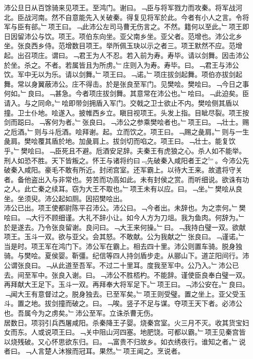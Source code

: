 \documentclass{zhvt-classic}
\begin{document}
\hspace*{2em}沛公旦日从百馀骑来见项王。至鸿门。谢曰。﹁臣与将军戮力而攻秦。将军战河北。臣战河南。然不自意能先入关破秦。得复见将军於此。今者有小人之言。令将军与臣有郤。﹂项王曰。﹁此沛公左司马曹无伤言之。不然。籍何以至此。﹂项王即日因留沛公与饮。项王。项伯东向坐。亚父南乡坐。亚父者。范增也。沛公北乡坐。张良西乡侍。范增数目项王。举所佩玉玦以示之者三。项王默然不应。范增起。出召项庄。谓曰。﹁君王为人不忍。若入前为寿。寿毕。请以剑舞。因击沛公於坐。杀之。不者。若属皆且为所虏。﹂庄则入为寿。寿毕。曰。﹁君王与沛公饮。军中无以为乐。请以剑舞。﹂项王曰。﹁诺。﹂项庄拔剑起舞。项伯亦拔剑起舞。常以身翼蔽沛公。庄不得击。於是张良至军门。见樊哙。樊哙曰。﹁今日之事何如。﹂良曰。﹁甚急。今者项庄拔剑舞。其意常在沛公也。﹂哙曰。﹁此迫矣。臣请入。与之同命。﹂哙即带剑拥盾入军门。交戟之卫士欲止不内。樊哙侧其盾以撞。卫士仆地。哙遂入。披帷西乡立。瞋目视项王。头发上指。目眦尽裂。项王按剑而跽曰。﹁客何为者。﹂张良曰。﹁沛公之参乘樊哙者也。﹂项王曰。﹁壮士。赐之卮酒。﹂则与斗卮酒。哙拜谢。起。立而饮之。项王曰。﹁赐之彘肩。﹂则与一生彘肩。樊哙覆其盾於地。加彘肩上。拔剑切而啗之。项王曰。﹁壮士。能复饮乎。﹂樊哙曰。﹁臣死且不避。卮酒安足辞。夫秦王有虎狼之心。杀人如不能举。刑人如恐不胜。天下皆叛之。怀王与诸将约曰﹃先破秦入咸阳者王之﹄。今沛公先破秦入咸阳。豪毛不敢有所近。封闭宫室。还军霸上。以待大王来。故遣将守关者。备他盗出入与非常也。劳苦而功高如此。未有封侯之赏。而听细说。欲诛有功之人。此亡秦之续耳。窃为大王不取也。﹂项王未有以应。曰。﹁坐。﹂樊哙从良坐。坐须臾。沛公起如厕。因招樊哙出。\\
\hspace*{2em}沛公已出。项王使都尉陈平召沛公。沛公曰。﹁今者出。未辞也。为之柰何。﹂樊哙曰。﹁大行不顾细谨。大礼不辞小让。如今人方为刀俎。我为鱼肉。何辞为。﹂於是遂去。乃令张良留谢。良问曰。﹁大王来何操。﹂曰。﹁我持白璧一双。欲献项王。玉斗一双。欲与亚父。会其怒。不敢献。公为我献之﹂张良曰。﹁谨诺。﹂当是时。项王军在鸿门下。沛公军在霸上。相去四十里。沛公则置车骑。脱身独骑。与樊哙。夏侯婴。靳彊。纪信等四人持剑盾步走。从郦山下。道芷阳间行。沛公谓张良曰。﹁从此道至吾军。不过二十里耳。度我至军中。公乃入。﹂沛公已去。间至军中。张良入谢。曰。﹁沛公不胜桮杓。不能辞。谨使臣良奉白璧一双。再拜献大王足下。玉斗一双。再拜奉大将军足下。﹂项王曰。﹁沛公安在。﹂良曰。﹁闻大王有意督过之。脱身独去。已至军矣。﹂项王则受璧。置之坐上。亚父受玉斗。置之地。拔剑撞而破之。曰。﹁唉。竖子不足与谋。夺项王天下者。必沛公也。吾属今为之虏矣。﹂沛公至军。立诛杀曹无伤。\\
\hspace*{2em}居数日。项羽引兵西屠咸阳。杀秦降王子婴。烧秦宫室。火三月不灭。收其货宝妇女而东。人或说项王曰。﹁关中阻山河四塞。地肥饶。可都以霸。﹂项王见秦宫皆以烧残破。又心怀思欲东归。曰。﹁富贵不归故乡。如衣绣夜行。谁知之者。﹂说者曰。﹁人言楚人沐猴而冠耳。果然。﹂项王闻之。烹说者。\\
\end{document}
